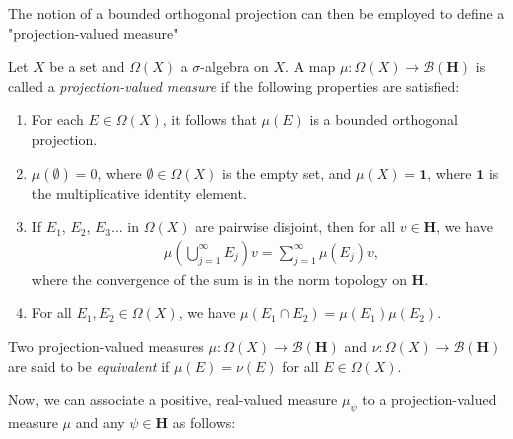 The notion of a bounded orthogonal projection can then be employed to define a "projection-valued measure"

\begin{definition}
    \label{def:projection-valued-measure}
    \leanok
    Let $X$ be a set and $\Omega(X)$ a $\sigma$-algebra on $X$. A map $\mu : \Omega(X) \rightarrow \mathcal{B}(\mathbf{H})$ is called a \textit{projection-valued measure} if the following properties are satisfied:
    \begin{enumerate}
        \item For each $E \in \Omega(X)$, it follows that $\mu(E)$ is a bounded orthogonal projection.
        \item $\mu(\emptyset) = 0$, where $\emptyset \in \Omega(X)$ is the empty set, and $\mu(X) = \mathbf{1}$, where $\mathbf{1}$ is the multiplicative identity element.
        \item If $E_1$, $E_2$, $E_3$... in $\Omega(X)$ are pairwise disjoint, then for all $v \in \mathbf{H}$, we have
        \begin{align}
            \mu \left( \bigcup_{j = 1}^{\infty} E_j \right) v = \sum_{j = 1}^{\infty} \mu(E_j)v,
        \end{align}
        where the convergence of the sum is in the norm topology on $\mathbf{H}$.
        \item For all $E_1, E_2 \in \Omega(X)$, we have $\mu(E_1 \cap E_2) = \mu(E_1) \mu(E_2)$.
    \end{enumerate}
    Two projection-valued measures $\mu : \Omega(X) \rightarrow \mathcal{B}(\mathbf{H})$ and $\nu : \Omega(X) \rightarrow \mathcal{B}(\mathbf{H})$ are said to be \textit{equivalent} if $\mu(E) = \nu(E)$ for all $E \in \Omega(X)$.
\end{definition}

Now, we can associate a positive, real-valued measure $\mu_\psi$ to a projection-valued measure $\mu$ and any $\psi \in \mathbf{H}$ as follows:

